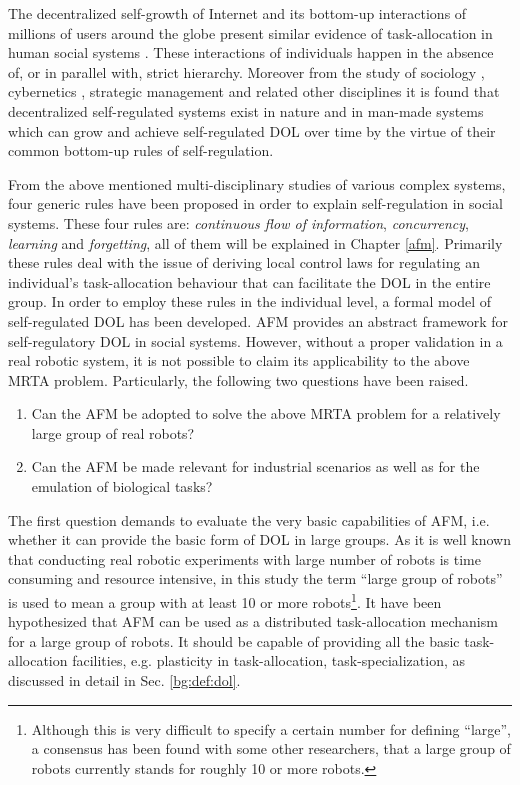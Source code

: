 The decentralized self-growth of Internet and its bottom-up interactions of millions of users around the globe present similar evidence of task-allocation in human social systems \cite{Andriani+2004}. These interactions of individuals happen in the absence of, or in parallel with, strict hierarchy. Moreover from the study of sociology \cite{Sayer+1992}, cybernetics \cite{Beer1981}, strategic management \cite{Kogut2000} and related other disciplines it is found that decentralized self-regulated systems exist in nature and in man-made systems which can grow and achieve self-regulated DOL over time by the virtue of their common bottom-up rules of self-regulation.
 
From the above mentioned multi-disciplinary studies of various complex systems, four generic rules have been proposed in order to explain self-regulation in social systems. These four rules are: \textit{continuous flow of information}, \textit{concurrency}, \textit{learning} and \textit{forgetting}, all of them will be explained in Chapter \ref{afm}. Primarily these rules deal with the issue of deriving local control laws for regulating an individual's task-allocation behaviour that can facilitate the DOL in the entire group. In order to employ these rules in the individual level, a formal model of self-regulated DOL has been developed. AFM provides an abstract framework for self-regulatory DOL in social systems. However, without a proper validation in a real robotic system, it is not possible to claim its applicability to the above MRTA problem. Particularly, the following two questions have been raised.
\begin{enumerate}
\item Can the AFM be adopted to solve the above MRTA problem for a relatively large group of real robots?
\item Can the AFM be made relevant for industrial scenarios as well as for the emulation of biological tasks?
\end{enumerate}
The first question demands to evaluate the very basic capabilities of AFM, i.e. whether it can provide the basic form of DOL in large groups. As it is well known that conducting real robotic experiments with large number of robots is time consuming and resource intensive, in this study the term ``large group of robots'' is used to mean a group with at least 10 or more robots\footnote{Although this is very difficult to specify a certain number for defining ``large'', a consensus has been found with some other researchers, \protect{} that a large group of robots currently stands for roughly 10 or more robots.}. It have been hypothesized that AFM can be used as a distributed task-allocation mechanism for a large group of robots. It should be capable of providing all the basic task-allocation facilities, e.g. plasticity in task-allocation, task-specialization, as discussed in detail in Sec. \ref{bg:def:dol}.

